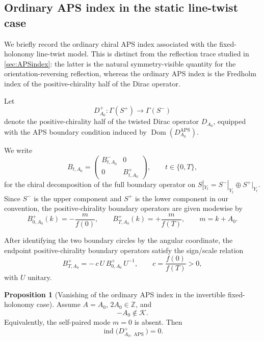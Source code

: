 \documentclass[11pt]{article}
\theoremstyle{definition}
\newtheorem{proposition}[theorem]{Proposition}
\DeclareMathOperator{\ind}{ind}
\DeclareMathOperator{\APS}{APS}
\DeclareMathOperator{\Dom}{Dom} \newcommand{\Z}{\mathbb{Z}} \DeclareMathOperator{\Ran}{Ran}
\numberwithin{equation}{section}
\begin{document}
\subsection{Ordinary APS index in the static line-twist case}

We briefly record the ordinary chiral APS index associated with the fixed-holonomy
line-twist model. This is distinct from the reflection trace studied in \autoref{sec:APSindex}: the latter is the natural symmetry-visible quantity for the orientation-reversing reflection,
whereas the ordinary APS index is the Fredholm index of the positive-chirality half of the
Dirac operator.

Let
\begin{equation}\label{eq:sec4_chiral_half_}
D_{A_0}^{+}:\Gamma(S^{+})\longrightarrow \Gamma(S^{-})
\end{equation}
denote the positive-chirality half of the twisted Dirac operator \(D_{A_0}\), equipped with
the APS boundary condition induced by \(\Dom(D_{A_0}^{\APS})\).

We write
\begin{equation}\label{eq:sec4_chiral_boundary_decomposition}
B_{t,A_0}=
\begin{pmatrix}
B^{-}_{t,A_0} & 0\\
0 & B^{+}_{t,A_0}
\end{pmatrix},
\qquad t\in\{0,T\},
\end{equation}
for the chiral decomposition of the full boundary operator on
\(S|_{Y_t}=S^{-}|_{Y_t}\oplus S^{+}|_{Y_t}\). Since \(S^{-}\) is the upper component and
\(S^{+}\) is the lower component in our convention, the positive-chirality boundary operators
are given modewise by
\begin{equation}\label{eq:sec4_positive_chiral_boundary_modes}
B^{+}_{0,A_0}(k)=-\frac{m}{f(0)},
\qquad
B^{+}_{T,A_0}(k)=+\frac{m}{f(T)},
\qquad
m=k+A_0.
\end{equation}

After identifying the two boundary circles by the angular coordinate, the endpoint
positive-chirality boundary operators satisfy the sign/scale relation
\begin{equation}\label{eq:sec4_positive_chiral_endpoint_relation}
B^{+}_{T,A_0}
=
-\,c\,U\,B^{+}_{0,A_0}\,U^{-1},
\qquad
c=\frac{f(0)}{f(T)}>0,
\end{equation}
with \(U\) unitary.



\begin{proposition}[Vanishing of the ordinary APS index in the invertible fixed-holonomy case]
\label{prop:sec4_static_APS_index_zero}
Assume \(A=A_0\), \(2A_0\in\Z\), and
\begin{equation}
-A_0\notin\mathcal K.
\end{equation}
Equivalently, the self-paired mode \(m=0\) is absent. Then
\begin{equation}
\ind\!\bigl(D_{A_0,\APS}^{+}\bigr)=0.
\end{equation}
\end{proposition}
\end{document}
